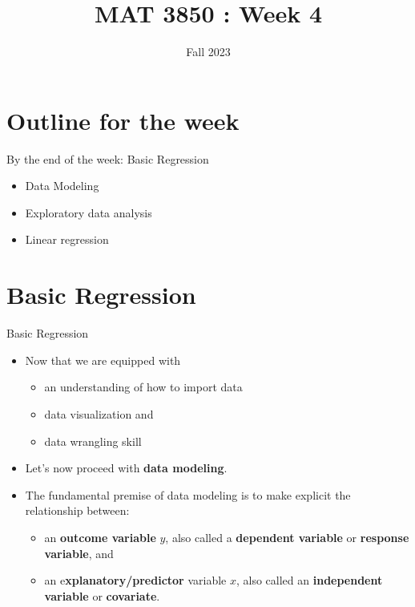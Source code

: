 \documentclass[
  ignorenonframetext,
]{beamer}
\title{MAT 3850 : Week 4}
\author{Fall 2023}
\date{}
\institute{App State}
\providecommand{\tightlist}{%
  \setlength{\itemsep}{0pt}\setlength{\parskip}{0pt}}
\begin{document}
\frame{\titlepage}

\hypertarget{outline-for-the-week}{%
\section{Outline for the week}\label{outline-for-the-week}}

\begin{frame}{By the end of the week: Basic Regression}
\protect\hypertarget{by-the-end-of-the-week-basic-regression}{}
\begin{itemize}
\tightlist
\item
  Data Modeling
\item
  Exploratory data analysis
\item
  Linear regression
\end{itemize}
\end{frame}

\hypertarget{basic-regression}{%
\section{Basic Regression}\label{basic-regression}}

\begin{frame}{Basic Regression}
\protect\hypertarget{basic-regression-1}{}
\begin{itemize}
\item
  Now that we are equipped with

  \begin{itemize}
  \tightlist
  \item
    an understanding of how to import data
  \item
    data visualization and
  \item
    data wrangling skill
  \end{itemize}
\item
  Let's now proceed with \textbf{data modeling}.
\item
  The fundamental premise of data modeling is to make explicit the
  relationship between:

  \begin{itemize}
  \tightlist
  \item
    an \textbf{outcome variable} \(y\), also called a \textbf{dependent
    variable} or \textbf{response variable}, and
  \item
    an e\textbf{xplanatory/predictor} variable \(x\), also called an
    \textbf{independent variable} or \textbf{covariate}.
  \end{itemize}
\end{itemize}
\end{frame}
\end{document}
